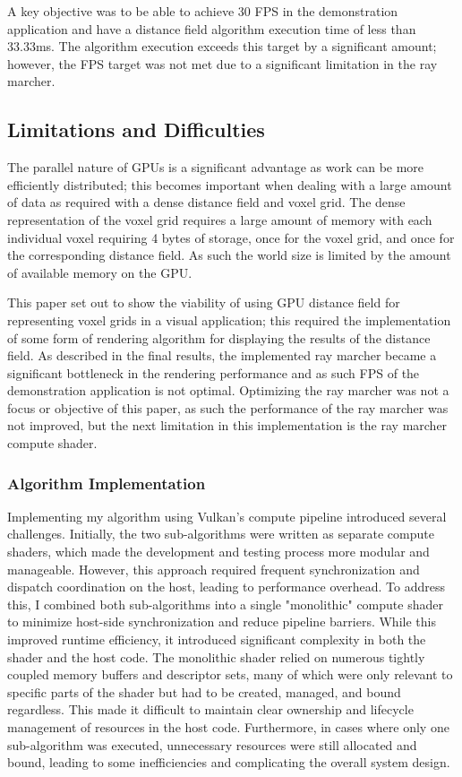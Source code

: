 A key objective was to be able to achieve 30 FPS in the demonstration application and have a distance field algorithm
execution time of less than 33.33ms. The algorithm execution exceeds this target by a significant amount; however,
the FPS target was not met due to a significant limitation in the ray marcher.

\subsection{Limitations and Difficulties}
The parallel nature of GPUs is a significant advantage as work can be more efficiently distributed; this becomes
important when dealing with a large amount of data as required with a dense distance field and voxel grid. The dense
representation of the voxel grid requires a large amount of memory with each individual voxel requiring 4 bytes of
storage, once for the voxel grid, and once for the corresponding distance field. As such the world size is limited by
the amount of available memory on the GPU.

This paper set out to show the viability of using GPU distance field for representing voxel grids in a visual
application; this required the implementation of some form of rendering algorithm for displaying the results of the
distance field. As described in the final results, the implemented ray marcher became a significant bottleneck in the
rendering performance and as such FPS of the demonstration application is not optimal. Optimizing the ray marcher was
not a focus or objective of this paper, as such the performance of the ray marcher was not improved, but the next
limitation in this implementation is the ray marcher compute shader.

\subsubsection{Algorithm Implementation}
Implementing my algorithm using Vulkan’s compute pipeline introduced several challenges. Initially, the two
sub-algorithms were written as separate compute shaders, which made the development and testing process more modular and
manageable. However, this approach required frequent synchronization and dispatch coordination on the host, leading to
performance overhead. To address this, I combined both sub-algorithms into a single "monolithic" compute shader to
minimize host-side synchronization and reduce pipeline barriers. While this improved runtime efficiency, it introduced
significant complexity in both the shader and the host code. The monolithic shader relied on numerous tightly coupled
memory buffers and descriptor sets, many of which were only relevant to specific parts of the shader but had to be
created, managed, and bound regardless. This made it difficult to maintain clear ownership and lifecycle management
of resources in the host code. Furthermore, in cases where only one sub-algorithm was executed, unnecessary resources
were still allocated and bound, leading to some inefficiencies and complicating the overall system design.

